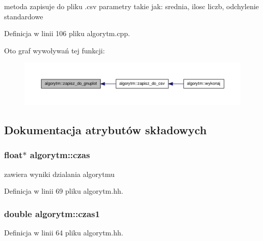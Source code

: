 metoda zapisuje do pliku .csv parametry takie jak\-: srednia, ilosc liczb, odchylenie standardowe 



\-Definicja w linii 106 pliku algorytm.\-cpp.



\-Oto graf wywoływań tej funkcji\-:\nopagebreak
\begin{figure}[H]
\begin{center}
\leavevmode
\includegraphics[width=350pt]{classalgorytm_ad2051f4366b78a7c73adc8b3418a495c_icgraph}
\end{center}
\end{figure}




\subsection{\-Dokumentacja atrybutów składowych}
\hypertarget{classalgorytm_a8005d5f3266848b756400e3bb189de58}{
\subsubsection[{czas}]{\setlength{\rightskip}{0pt plus 5cm}float$\ast$ {\bf algorytm\-::czas}}}\label{classalgorytm_a8005d5f3266848b756400e3bb189de58}


zawiera wyniki dzialania algorytmu 



\-Definicja w linii 69 pliku algorytm.\-hh.

\hypertarget{classalgorytm_a4dae8e390930e55b11f9e0f4efd9edaf}{
\subsubsection[{czas1}]{\setlength{\rightskip}{0pt plus 5cm}double {\bf algorytm\-::czas1}}}\label{classalgorytm_a4dae8e390930e55b11f9e0f4efd9edaf}


\-Definicja w linii 64 pliku algorytm.\-hh.

